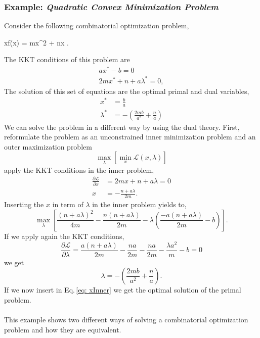 \subsubsection{Example: \textit{Quadratic Convex Minimization Problem}}
Consider the following combinatorial optimization problem,
\begin{mini!}[2]
	{x}{f(x) = mx^{2} + nx}{}{}{\quad {}}
	.
\end{mini!}
The KKT conditions of this problem are
\begin{align}
    ax^{*}-b=0 \\
    2mx^{*}+n + a\lambda^{*}= 0,
\end{align}
The solution of this set of equations are the optimal primal and dual variables,
\begin{align}
    x^{*} &= \frac{b}{a} \\
    \lambda^{*} &= - \left(\frac{2mb}{a^{2}} + \frac{n}{a}\right)
\end{align}
We can solve the problem in a different way by using the dual theory. First, reformulate the problem as an unconstrained inner minimization problem and an outer maximization problem
\begin{equation}
    \max_{\lambda}\left[\min_{x}\mathcal{L}(x,\lambda)\right]
\end{equation}
apply the KKT conditions in the inner problem,
\begin{align}
    \frac{\partial \mathcal{L}}{\partial x} &= 2mx + n + a\lambda = 0 \\
    x &= - \frac{n + a\lambda}{2m}\label{eq: xInner}.
\end{align}
Inserting the $x$ in term of $\lambda$ in the inner problem yields to,
\begin{equation}
    \max_{\lambda} \left[\frac{(n+a\lambda)^{2}}{4m} - \frac{n(n+a\lambda)}{2m} - \lambda\left(\frac{-a(n+a\lambda)}{2m} - b\right)\right].
\end{equation}
If we apply again the KKT conditions,
\begin{equation}
    \frac{\partial \mathcal{L}}{\partial \lambda} = \frac{a(n + a\lambda)}{2m} - \frac{na}{2m} - \frac{na}{2m} - \frac{\lambda a^{2}}{m} - b = 0
\end{equation}
we get
\begin{equation}
    \lambda = - \left(\frac{2mb}{a^{2}} + \frac{n}{a}\right).
\end{equation}
If we now insert in Eq.\,\eqref{eq: xInner} we get the optimal solution of the primal problem.\\\\
This example shows two different ways of solving a combinatorial optimization problem and how they are equivalent.
